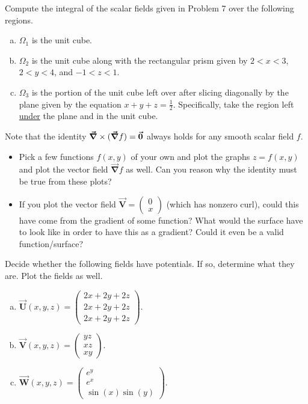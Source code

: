 \documentclass[12pt]{article} %
\newcommand{\vecfieldV}{\boldsymbol{\vec{V}}}
\newcommand{\vecfieldW}{\boldsymbol{\vec{W}}}
\newcommand{\vecfieldU}{\boldsymbol{\vec{U}}}
\newcommand{\grad}{\boldsymbol{\vec{\nabla}}}
\begin{document}
\begin{problem}
    Compute the integral of the scalar fields given in Problem 7 over the following regions.
  \begin{multicols}{2}
  \begin{enumerate}[(a)]
      \item $\Omega_1$ is the unit cube.
      \item $\Omega_2$ is the unit cube along with the rectangular prism given by $2<x<3$, $2<y<4$, and $-1<z<1$.
      \item $\Omega_3$ is the portion of the unit cube left over after slicing diagonally by the plane given by the equation $x+y+z=\frac{1}{2}$. Specifically, take the region left \underline{under} the plane and in the unit cube.
  \end{enumerate}
  \end{multicols}  
\end{problem}

\begin{problem}
    Note that the identity $\grad \times (\grad f)=\zerovec$ always holds for any smooth scalar field $f$. 
    \begin{itemize}
        \item Pick a few functions $f(x,y)$ of your own and plot the graphs $z=f(x,y)$ and plot the vector field $\grad f$ as well.  Can you reason why the identity must be true from these plots? 
        \item If you plot the vector field $\vecfieldV = \begin{pmatrix} 0 \\ x \end{pmatrix}$ (which has nonzero curl), could this have come from the gradient of some function? What would the surface have to look like in order to have this as a gradient? Could it even be a valid function/surface?
    \end{itemize}
\end{problem}

\begin{problem}
    Decide whether the following fields have potentials.  If so, determine what they are. Plot the fields as well.
    \begin{enumerate}[(a)]
        \item $\vecfieldU(x,y,z) = \begin{pmatrix} 2x + 2y + 2z \\ 2x + 2y + 2z \\ 2x + 2y + 2z \end{pmatrix}$.
        \item $\vecfieldV(x,y,z) = \begin{pmatrix} yz \\ xz \\ xy \end{pmatrix}$.
        \item $\vecfieldW(x,y,z) = \begin{pmatrix} e^y \\ e^x \\ \sin(x)\sin(y) \end{pmatrix}$.
    \end{enumerate}
\end{problem}
\end{document}
